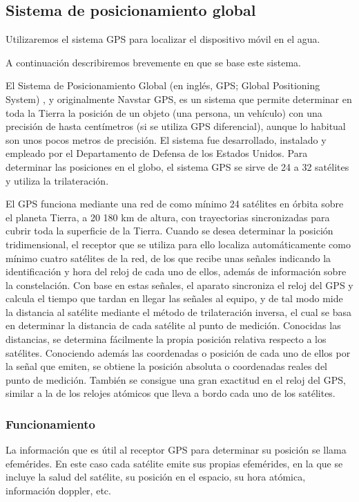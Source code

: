 \subsection{Sistema de posicionamiento global}
Utilizaremos el sistema GPS para localizar el dispositivo móvil en el agua.

A continuación describiremos brevemente en que se base este sistema.

El Sistema de Posicionamiento Global (en inglés, GPS; Global Positioning System)
, y originalmente Navstar GPS, es un sistema que permite determinar
 en toda la Tierra la posición de un objeto (una persona, un vehículo)
 con una precisión de hasta centímetros (si se utiliza GPS diferencial), 
aunque lo habitual son unos pocos metros de precisión. El sistema fue
 desarrollado, instalado y empleado por el Departamento de Defensa
 de los Estados Unidos. Para determinar las posiciones en el globo, 
el sistema GPS se sirve de 24 a 32 satélites y utiliza la trilateración.

El GPS funciona mediante una red de como mínimo 24 satélites en
 órbita sobre el planeta Tierra, a 20 180 km de altura, con trayectorias 
sincronizadas para cubrir toda la superficie de la Tierra. Cuando
 se desea determinar la posición tridimensional, el receptor que se 
utiliza para ello localiza automáticamente como mínimo cuatro satélites 
de la red, de los que recibe unas señales indicando la identificación 
y hora del reloj de cada uno de ellos, además de información sobre 
la constelación. Con base en estas señales, el aparato sincroniza el 
reloj del GPS y calcula el tiempo que tardan en llegar las señales al 
equipo, y de tal modo mide la distancia al satélite mediante el método 
de trilateración inversa, el cual se basa en determinar la distancia
 de cada satélite al punto de medición. Conocidas las distancias, 
se determina fácilmente la propia posición relativa respecto a los
 satélites. Conociendo además las coordenadas o posición de cada
 uno de ellos por la señal que emiten, se obtiene la posición absoluta
 o coordenadas reales del punto de medición. También se consigue
 una gran exactitud en el reloj del GPS, similar a la de los relojes
 atómicos que lleva a bordo cada uno de los satélites.

\subsubsection{Funcionamiento}

La información que es útil al receptor GPS para determinar su
 posición se llama efemérides. En este caso cada satélite emite
 sus propias efemérides, en la que se incluye la salud del satélite, 
su posición en el espacio, su hora atómica, información doppler, etc.

